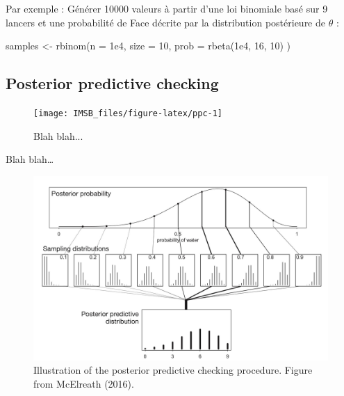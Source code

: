 \documentclass[
  a4paper,11pt,twoside,onecolumn,openright,final,oldfontcommands]{memoir}
\newenvironment{Shaded}{\begin{snugshade}}{\end{snugshade}}
\newcommand{\AttributeTok}[1]{\textcolor[rgb]{0.77,0.63,0.00}{#1}}
\newcommand{\DecValTok}[1]{\textcolor[rgb]{0.00,0.00,0.81}{#1}}
\newcommand{\FloatTok}[1]{\textcolor[rgb]{0.00,0.00,0.81}{#1}}
\newcommand{\FunctionTok}[1]{\textcolor[rgb]{0.00,0.00,0.00}{#1}}
\newcommand{\NormalTok}[1]{#1}
\newcommand{\OtherTok}[1]{\textcolor[rgb]{0.56,0.35,0.01}{#1}}
\theoremstyle{definition}
\theoremstyle{definition}
\theoremstyle{definition}
\theoremstyle{definition}
\theoremstyle{remark}
\begin{document}
Par exemple : Générer 10000 valeurs à partir d'une loi binomiale basé sur 9 lancers et une probabilité de Face décrite par la distribution postérieure de \(\theta\) :

\begin{Shaded}
\begin{Highlighting}[]
\NormalTok{samples }\OtherTok{\textless{}{-}} \FunctionTok{rbinom}\NormalTok{(}\AttributeTok{n =} \FloatTok{1e4}\NormalTok{, }\AttributeTok{size =} \DecValTok{10}\NormalTok{, }\AttributeTok{prob =} \FunctionTok{rbeta}\NormalTok{(}\FloatTok{1e4}\NormalTok{, }\DecValTok{16}\NormalTok{, }\DecValTok{10}\NormalTok{) )}
\end{Highlighting}
\end{Shaded}

\hypertarget{posterior-predictive-checking}{%
\subsection{Posterior predictive checking}\label{posterior-predictive-checking}}

\begin{figure}[!htb]

{\centering \texttt{[image: IMSB\_files/figure-latex/ppc-1]} 

}

\caption{Blah blah...}\label{fig:ppc}
\end{figure}

Blah blah\ldots{}

\begin{figure}[!htb]

{\centering \includegraphics[width=1\linewidth]{figures/ModelPredictions} 

}

\caption{Illustration of the posterior predictive checking procedure. Figure from McElreath (2016).}\label{fig:ppc-rethinking}
\end{figure}
\end{document}
